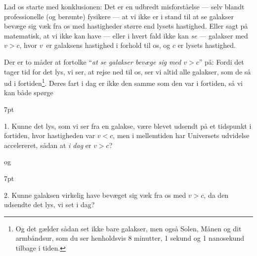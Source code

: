 \documentclass[useAMS,danish]{aa}
\def\vrec{\mbox{$v$}}
\newenvironment{formal}{%
  \def\FrameCommand{%
    \hspace{1pt}%
    {\color{blue}\vrule width 2pt}%
    {\color{formalshade}\vrule width 4pt}%
    \colorbox{formalshade}%
  }%
  \MakeFramed{\advance\hsize-\width\FrameRestore}%
  \noindent\hspace{-4.55pt}%
  \begin{adjustwidth}{}{7pt}%
  \vspace{2pt}\vspace{2pt}%
}
{%
  \vspace{2pt}\end{adjustwidth}\endMakeFramed%
}
\begin{document}





Lad os starte med konklusionen:
Det er en udbredt misforståelse --- selv blandt professionelle (og berømte) fysikere --- at vi ikke er i stand til at se galakser bevæge sig væk fra os med hastigheder større end lysets hastighed.
Eller sagt på matematisk, at vi ikke kan have --- eller i hvert fald ikke kan \emph{se} --- galakser med $\vrec > c$, hvor \vrec\ er galaksens hastighed i forhold til os, og $c$ er lysets hastighed.

Der er to måder at fortolke ``\emph{at se galakser bevæge sig med $\vrec>c$}'' på:
Fordi det tager tid for det lys, vi ser, at rejse ned til os, ser vi altid alle galakser, som de så ud i fortiden\footnote{Og det gælder sådan set ikke bare galakser, men også Solen, Månen og dit armbåndsur, som du ser henholdsvis 8 minutter, 1 sekund og 1 nanosekund tilbage i tiden.}.
Deres fart i dag er ikke den samme som den var i fortiden, så vi kan både spørge
\begin{formal}
    1. Kunne det lys, som vi ser fra en galakse, være blevet udsendt på et tidspunkt i fortiden, hvor hastigheden var $\vrec<c$, men i mellemtiden har Universets udvidelse accelereret, sådan at \emph{i dag} er $\vrec>c$?
\end{formal}
og
\begin{formal}
    2. Kunne galaksen virkelig have bevæget sig væk fra os med $\vrec>c$, da den udsendte det lys, vi set i dag?
\end{formal}
\end{document}
